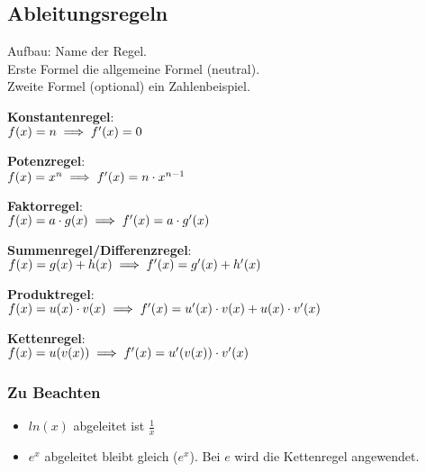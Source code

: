 \subsection{Ableitungsregeln}
\label{sec:ableitungs_regeln}
Aufbau: Name der Regel. \\
Erste Formel die allgemeine Formel (neutral). \\
Zweite Formel (optional) ein Zahlenbeispiel.

\begin{multicols}{2}

\textbf{Konstantenregel}: \\
$
f(x) = n \\
\implies f'(x) = 0
$

\vspace{0.5cm}

\textbf{Potenzregel}: \\
$
f(x) = x^n \\
\implies f'(x) = n\cdot x^{n - 1}
$

\vspace{0.5cm}

\textbf{Faktorregel}: \\
$
f(x) = a\cdot g(x) \\
\implies f'(x) = a\cdot g'(x)
$

\columnbreak

\textbf{Summenregel/Differenzregel}: \\
$
f(x) = g(x) + h(x) \\
\implies f'(x) = g'(x) + h'(x) 
$

\vspace{0.5cm}

\textbf{Produktregel}: \\
$
f(x) = u(x) \cdot v(x) \\
\implies f'(x) = u'(x) \cdot v(x) + u(x) \cdot v'(x)
$ 

\vspace{0.5cm}

\textbf{Kettenregel}: \\
$
f(x) = u(v(x)) \\
\implies f'(x) = u'(v(x)) \cdot v'(x)
$

\end{multicols}

\subsubsection{Zu Beachten}
\begin{itemize}
    \item $ln(x)$ abgeleitet ist $\frac{1}{x}$
    \item $e^x$ abgeleitet bleibt gleich ($e^x$). Bei $e$ wird die Kettenregel angewendet.
\end{itemize}

